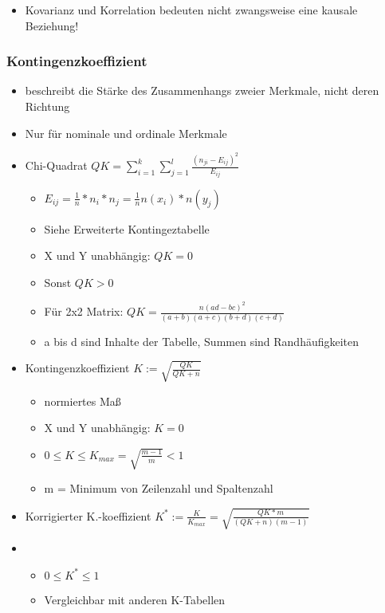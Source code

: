 \documentclass[a4paper]{article}
\begin{document}
\begin{landscape}
\begin{multicols}{4}
\begin{itemize}[noitemsep,nolistsep,leftmargin=*]
\begin{itemize}[noitemsep,nolistsep,leftmargin=*]
        \end{itemize}
        \item Kovarianz und Korrelation bedeuten nicht zwangsweise eine kausale Beziehung!
    \end{itemize}

    \subsubsection*{Kontingenzkoeffizient}
    \begin{itemize}[noitemsep,nolistsep,leftmargin=*]
        \item beschreibt die Stärke des Zusammenhangs zweier Merkmale, nicht deren Richtung
        \item Nur für nominale und ordinale Merkmale
        \item Chi-Quadrat $QK = \sum_{i=1}^{k}\sum_{j=1}^{l}\frac{(n_{ji}-E_{ij})^2}{E_{ij}}$
        \begin{itemize}[noitemsep,nolistsep,leftmargin=*]
            \item $E_{ij} = \frac{1}{n}*n_i*n_j = \frac{1}{n}n(x_i)*n(y_j)$
            \item Siehe Erweiterte Kontingeztabelle
            \item X und Y unabhängig: $QK = 0$
            \item Sonst $QK > 0$
            \item Für 2x2 Matrix: $QK = \frac{n(ad-bc)^2}{(a+b)(a+c)(b+d)(c+d)}$
            \item a bis d sind Inhalte der Tabelle, Summen sind Randhäufigkeiten
            
        \end{itemize}
        \item Kontingenzkoeffizient $K := \sqrt{\frac{QK}{QK+n}}$
        \begin{itemize}[noitemsep,nolistsep,leftmargin=*]
            \item normiertes Maß
            \item X und Y unabhängig: $K = 0$
            \item $0  \leq K  \leq K_{max} = \sqrt{\frac{m-1}{m}} < 1$
            \item m = Minimum von Zeilenzahl und Spaltenzahl
        \end{itemize}
        \item Korrigierter K.-koeffizient $K^* := \frac{K}{K_{max}} = \sqrt{\frac{QK*m}{(QK+n)(m-1)}}$
        \item \begin{itemize}[noitemsep,nolistsep,leftmargin=*]
            \item $ 0  \leq K^*  \leq 1$
            \item Vergleichbar mit anderen K-Tabellen
        \end{itemize}
    \end{itemize}



\end{multicols}
\end{landscape}
\end{document}
